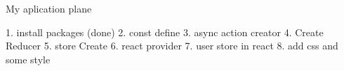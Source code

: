 My aplication plane 

1. install packages (done)
2. const define 
3. async action creator
4. Create Reducer
5. store Create 
6. react provider 
7. user store in react
8. add css and some style